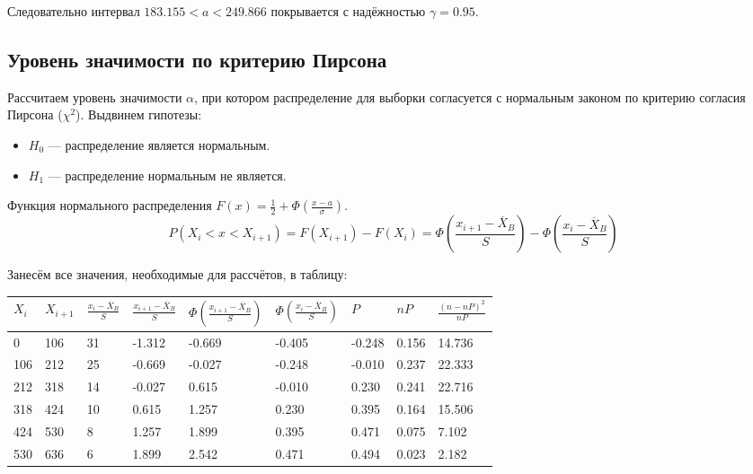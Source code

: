 \documentclass[titlepage]{article}
\begin{document}
Следовательно интервал $183.155 < a < 249.866$ покрывается с надёжностью  $\gamma = 0.95$.

\subsection{Уровень значимости по критерию Пирсона}
Рассчитаем уровень значимости $\alpha$, при котором распределение для выборки согласуется с нормальным законом по критерию согласия Пирсона ($\chi^2$).
Выдвинем гипотезы:

\begin{itemize}
	\item $H_0$ --- распределение является нормальным.
	\item $H_1$ --- распределение нормальным не является.
\end{itemize}

Функция нормального распределения $F (x) = \frac{1}{2} + \Phi(\frac{x - a}{\sigma})$.
\begin{equation*}
P(X_i < x < X_{i+1}) = F(X_{i+1}) - F(X_i) = \Phi \left( \frac{x_{i+1} - \overline{X}_B}{S} \right) - \Phi \left(\frac{x_i - \overline{X}_B}{S} \right)
\end{equation*}

\clearpage
Занесём все значения, необходимые для рассчётов, в таблицу:
\begin{table}[!ht]
    \centering
    \begin{tabular}{|l|l|l|l|l|l|l|l|l|}
    \hline
		$X_i$ & $X_{i+1}$ & $\frac{x_i - \overline{X}_B}{S}$ & $\frac{x_{i+1} - \overline{X}_B}{S}$ & $\Phi \left( \frac{x_{i+1} - \overline{X}_B}{S} \right)$ & $\Phi \left(\frac{x_i - \overline{X}_B}{S} \right)$ & $P$ & $nP$ & $\frac{(n - nP)^2}{nP}$ \\ \hline
		0 & 106 & 31 & -1.312 & -0.669 & -0.405 & -0.248 & 0.156 & 14.736 \\ \hline
		106 & 212 & 25 & -0.669 & -0.027 & -0.248 & -0.010 & 0.237 & 22.333 \\ \hline
		212 & 318 & 14 & -0.027 & 0.615  & -0.010 &  0.230 & 0.241 & 22.716 \\ \hline
		318 & 424 & 10 & 0.615  & 1.257  &  0.230 &  0.395 & 0.164 & 15.506 \\ \hline
		424 & 530 &  8 & 1.257  & 1.899  &  0.395 &  0.471 & 0.075 &  7.102 \\ \hline
		530 & 636 &  6 & 1.899  & 2.542  &  0.471 &  0.494 & 0.023 &  2.182 \\ \hline
    \end{tabular}
\end{table}
\end{document}
